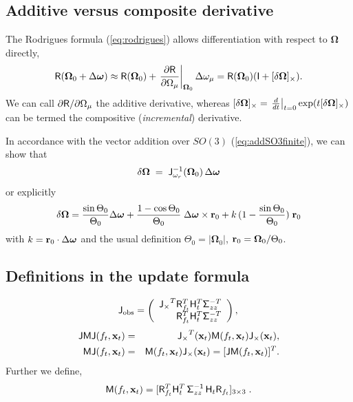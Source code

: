 \documentclass[conference]{IEEEtran}
\newcommand{\bfomega}{\boldsymbol{\omega}}
\newcommand{\bfOmega}{\boldsymbol{\Omega}}
\newcommand{\sigmazz}{\mathsf{\Sigma^{-1}_\mathnormal{zz}}}
\newcommand{\JMJ}{\mathsf{JMJ}}
\newcommand{\JM}{\mathsf{JM}}
\newcommand{\MJ}{\mathsf{MJ}}
\newcommand{\beq}{\begin{equation}}
\newcommand{\eeq}{\end{equation}}
\newcommand{\beqar}{\begin{eqnarray}}
\newcommand{\eeqar}{\end{eqnarray}}
\begin{document}
\begin{appendix}
\subsection{Additive versus composite derivative}
\label{app:incremental}
The Rodrigues formula (\ref{eq:rodrigues}) allows differentiation with respect to $\bfOmega$ directly,
\beq
    {\sf R}(\bfOmega_0+\Delta\bfomega) \approx 
    {\sf R}(\bfOmega_0) + \left. {\partial{\sf R}\over \partial\Omega_\mu} \right|_{\bfOmega_0}
    \Delta\omega_\mu = {\sf R}(\bfOmega_0) ( {\sf I} + [\delta\bfOmega]_\times ).
    \label{eq:rodriguesder}
\eeq
We can call $\partial{\sf R}/ \partial\Omega_\mu$ the additive derivative, whereas 
$[\delta\bfOmega]_\times = \left.{d\over dt}\right|_{t=0} \exp( t [\delta\bfOmega]_\times )$
can be termed the compositive ({\em incremental}) derivative.

In accordance with the vector addition over $SO(3)$ (\ref{eq:addSO3finite}), we can show that
\beq
     \delta\bfOmega \; = \; {\sf J}^{-1}_{\omega_r}(\bfOmega_0)\, \Delta\bfomega
    \label{eq:SO3localglobal}
\eeq
or explicitly
\beq
    \delta{\bfOmega}=
    {\sin\Theta_0\over\Theta_0} \Delta\bfomega + {1-\cos\Theta_0\over\Theta_0}\; \Delta\bfomega\times{\bf r}_0 +
    k\,(1-{\sin\Theta_0\over\Theta_0}) \; {\bf r}_0
    \nonumber
\eeq
with $k={\bf r}_0\cdot\Delta\bfomega$ and the usual definition $\Theta_0=|\bfOmega_0|$,
${\bf r}_0 = \bfOmega_0/\Theta_0$.

\subsection{Definitions in the update formula}
\label{app:updatedefs}
\beq
  {\sf J}_{\rm obs} =
   \left( \begin{array}{r}
        {\sf J_\times}^T {\sf R}^T_{f_t} {\sf H}_t^T \mathsf{\Sigma}_{zz}^{-T}\\
        {\sf R}^T_{f_t} {\sf H}_t^T \mathsf{\Sigma}_{zz}^{-T}
        \end{array} \right),\\
\eeq
\beqar
    \JMJ(f_t,{\bf x}_t) &=& {\sf J_\times}^T({\bf x}_t) {\sf M}(f_t,{\bf x}_t) {\sf J_\times}({\bf x}_t), \nonumber \\
    \MJ(f_t,{\bf x}_t) &=& {\sf M}(f_t,{\bf x}_t) {\sf J_\times}({\bf x}_t) = [\JM(f_t,{\bf x}_t)]^T. \nonumber
\eeqar
Further we define,
\beq
    {\sf M}(f_t,{\bf x}_t) = [{\sf R}_{f_t}^T{\sf H}_t^T \, \sigmazz \, {\sf H}_t {\sf R}_{f_t}]_{3\times 3}\;. \label{eq:NLnotation2}
\eeq


\end{appendix}
\end{document}
